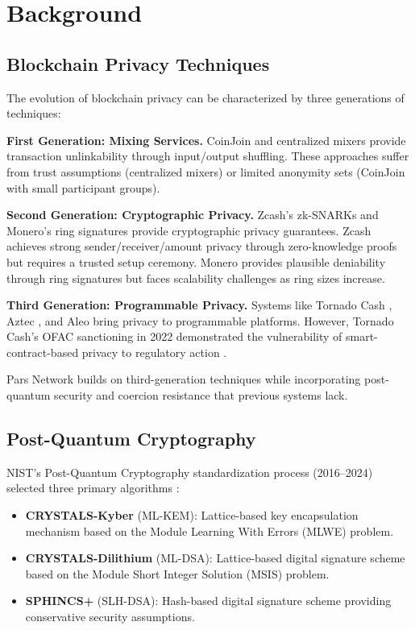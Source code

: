\documentclass[11pt,a4paper,twocolumn]{article}
\begin{document}
\section{Background}
\label{sec:background}

\subsection{Blockchain Privacy Techniques}

The evolution of blockchain privacy can be characterized by three generations of techniques:

\textbf{First Generation: Mixing Services.} CoinJoin \cite{maxwell2013coinjoin} and centralized mixers provide transaction unlinkability through input/output shuffling. These approaches suffer from trust assumptions (centralized mixers) or limited anonymity sets (CoinJoin with small participant groups).

\textbf{Second Generation: Cryptographic Privacy.} Zcash's zk-SNARKs \cite{sasson2014zerocash} and Monero's ring signatures \cite{noether2015ring} provide cryptographic privacy guarantees. Zcash achieves strong sender/receiver/amount privacy through zero-knowledge proofs but requires a trusted setup ceremony. Monero provides plausible deniability through ring signatures but faces scalability challenges as ring sizes increase.

\textbf{Third Generation: Programmable Privacy.} Systems like Tornado Cash \cite{pertsev2019tornado}, Aztec \cite{williamson2018aztec}, and Aleo \cite{aleo2021} bring privacy to programmable platforms. However, Tornado Cash's OFAC sanctioning in 2022 demonstrated the vulnerability of smart-contract-based privacy to regulatory action \cite{ofac2022tornado}.

Pars Network builds on third-generation techniques while incorporating post-quantum security and coercion resistance that previous systems lack.

\subsection{Post-Quantum Cryptography}

NIST's Post-Quantum Cryptography standardization process (2016--2024) selected three primary algorithms \cite{nist2024pqc}:

\begin{itemize}[leftmargin=*]
  \item \textbf{CRYSTALS-Kyber} (ML-KEM): Lattice-based key encapsulation mechanism based on the Module Learning With Errors (MLWE) problem.
  \item \textbf{CRYSTALS-Dilithium} (ML-DSA): Lattice-based digital signature scheme based on the Module Short Integer Solution (MSIS) problem.
  \item \textbf{SPHINCS+} (SLH-DSA): Hash-based digital signature scheme providing conservative security assumptions.
\end{itemize}
\end{document}

